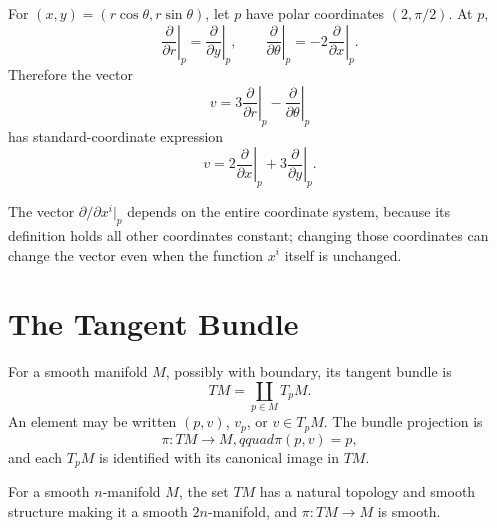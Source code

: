 \begin{example}
\label{ex:3-16}
\leanok
{}
For $(x,y)=(r\cos\theta,r\sin\theta)$, let $p$ have polar coordinates
$(2,\pi/2)$. At $p$,
\[
\left.\frac{\partial}{\partial r}\right|_p
=\left.\frac{\partial}{\partial y}\right|_p,
\qquad
\left.\frac{\partial}{\partial\theta}\right|_p
=-2\left.\frac{\partial}{\partial x}\right|_p.
\]
Therefore the vector
\[
v=3\left.\frac{\partial}{\partial r}\right|_p
-\left.\frac{\partial}{\partial\theta}\right|_p
\]
has standard-coordinate expression
\[
v=2\left.\frac{\partial}{\partial x}\right|_p
+3\left.\frac{\partial}{\partial y}\right|_p.
\]
\end{example}

\begin{remark}
\label{rem:3-15-extra-5}
\mathlibok
The vector $\partial/\partial x^i|_p$ depends on the entire coordinate system,
because its definition holds all other coordinates constant; changing those
coordinates can change the vector even when the function $x^i$ itself is
unchanged.
\end{remark}



\section{The Tangent Bundle}

\begin{definition}
\label{def:3-16-extra-1}
\mathlibok
For a smooth manifold $M$, possibly with boundary, its tangent bundle is
\[
TM=\coprod_{p\in M}T_pM.
\]
An element may be written $(p,v)$, $v_p$, or $v\in T_pM$. The bundle
projection is
\[
\pi:TM\to M,qquad \pi(p,v)=p,
\]
and each $T_pM$ is identified with its canonical image in $TM$.
\end{definition}

\begin{proposition}
\label{prop:3-18}
\mathlibok
{}
For a smooth $n$-manifold $M$, the set $TM$ has a natural topology and smooth
structure making it a smooth $2n$-manifold, and $\pi:TM\to M$ is smooth.
\end{proposition}


